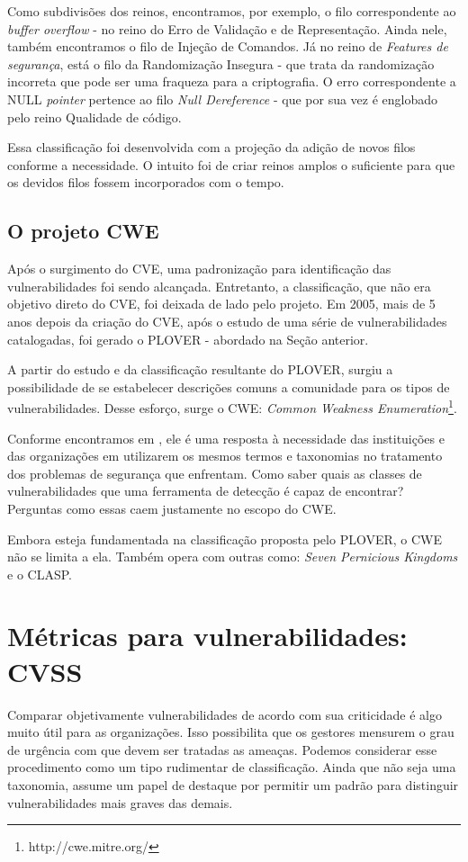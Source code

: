 			
			Como subdivisões dos reinos, encontramos, por exemplo, o filo correspondente ao
			\textsl{buffer overflow} - no reino do Erro de Validação e de Representação.
			Ainda nele, também encontramos o filo de Injeção de Comandos.			
			Já no reino de \textsl{Features de segurança}, está o filo da Randomização Insegura -
			que trata da randomização incorreta que pode ser uma fraqueza para a criptografia.
			O erro correspondente a NULL \textsl{pointer} pertence ao filo \textsl{Null Dereference} -
			que por sua vez é englobado pelo reino Qualidade de código.
			

			Essa classificação foi desenvolvida com a projeção da adição de novos filos
			conforme a necessidade. O intuito foi de criar reinos amplos o suficiente para que
			os devidos filos fossem incorporados com o tempo.

		
		\subsection{O projeto CWE}
			\label{subsec:cwe}
			Após o surgimento do CVE, uma padronização para identificação das vulnerabilidades
			foi sendo alcançada. Entretanto, a classificação, que não era objetivo direto do CVE,
			foi deixada de lado pelo projeto. Em 2005, mais de 5 anos depois da criação do CVE, 
			após o estudo de uma série de vulnerabilidades catalogadas, foi 
			gerado o PLOVER - abordado na Seção anterior.
			

			A partir do estudo e da classificação resultante do PLOVER, surgiu a possibilidade
			de se estabelecer descrições comuns a comunidade para os tipos de vulnerabilidades.
			Desse esforço, surge o CWE: \textsl{Common Weakness Enumeration}\footnote{http://cwe.mitre.org/}.

			
			Conforme encontramos em \cite{CWEAbout}, ele é uma resposta à necessidade das instituições
			e das organizações em utilizarem os mesmos termos e taxonomias no tratamento dos
			problemas de segurança que enfrentam. Como saber quais as classes de vulnerabilidades
			que uma ferramenta de detecção é capaz de encontrar? Perguntas como essas caem justamente
			no escopo do CWE.
			

			Embora esteja fundamentada na classificação proposta pelo PLOVER, o CWE não se limita
			a ela. Também opera com outras como: \textsl{Seven Pernicious Kingdoms} e o CLASP.
			

	

			

	\section{Métricas para vulnerabilidades: CVSS}
		Comparar objetivamente vulnerabilidades de acordo com sua criticidade é
		algo muito útil para as organizações.
		Isso possibilita que os gestores mensurem o grau de urgência com que devem
		ser tratadas as ameaças. Podemos considerar esse procedimento
		como um tipo rudimentar de classificação. Ainda que não seja uma taxonomia,
		assume um papel de destaque por permitir um padrão para distinguir
		vulnerabilidades mais graves das demais.

